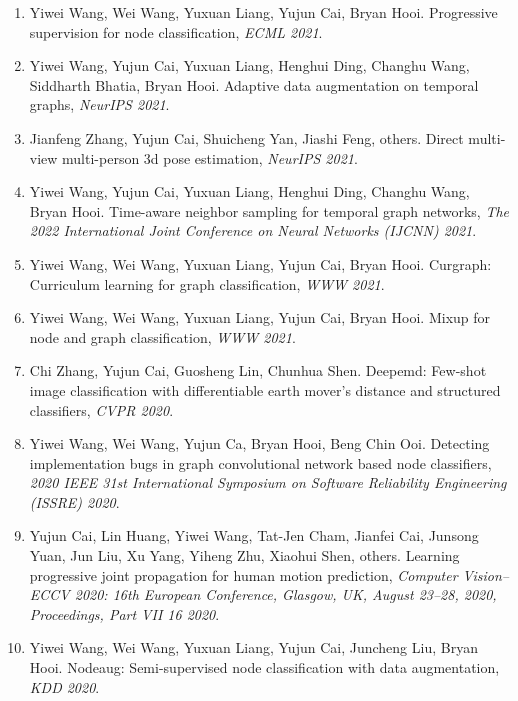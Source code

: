 \begin{enumerate}
\item Yiwei Wang, Wei Wang, Yuxuan Liang, Yujun Cai, Bryan Hooi. Progressive supervision for node classification, \textit{ECML 2021}.

\item Yiwei Wang, Yujun Cai, Yuxuan Liang, Henghui Ding, Changhu Wang, Siddharth Bhatia, Bryan Hooi. Adaptive data augmentation on temporal graphs, \textit{NeurIPS 2021}.

\item Jianfeng Zhang, Yujun Cai, Shuicheng Yan, Jiashi Feng, others. Direct multi-view multi-person 3d pose estimation, \textit{NeurIPS 2021}.

\item Yiwei Wang, Yujun Cai, Yuxuan Liang, Henghui Ding, Changhu Wang, Bryan Hooi. Time-aware neighbor sampling for temporal graph networks, \textit{The 2022 International Joint Conference on Neural Networks (IJCNN) 2021}.

\item Yiwei Wang, Wei Wang, Yuxuan Liang, Yujun Cai, Bryan Hooi. Curgraph: Curriculum learning for graph classification, \textit{WWW 2021}.

\item Yiwei Wang, Wei Wang, Yuxuan Liang, Yujun Cai, Bryan Hooi. Mixup for node and graph classification, \textit{WWW 2021}.

\item Chi Zhang, Yujun Cai, Guosheng Lin, Chunhua Shen. Deepemd: Few-shot image classification with differentiable earth mover's distance and structured classifiers, \textit{CVPR 2020}.

\item Yiwei Wang, Wei Wang, Yujun Ca, Bryan Hooi, Beng Chin Ooi. Detecting implementation bugs in graph convolutional network based node classifiers, \textit{2020 IEEE 31st International Symposium on Software Reliability Engineering (ISSRE) 2020}.

\item Yujun Cai, Lin Huang, Yiwei Wang, Tat-Jen Cham, Jianfei Cai, Junsong Yuan, Jun Liu, Xu Yang, Yiheng Zhu, Xiaohui Shen, others. Learning progressive joint propagation for human motion prediction, \textit{Computer Vision--ECCV 2020: 16th European Conference, Glasgow, UK, August 23--28, 2020, Proceedings, Part VII 16 2020}.

\item Yiwei Wang, Wei Wang, Yuxuan Liang, Yujun Cai, Juncheng Liu, Bryan Hooi. Nodeaug: Semi-supervised node classification with data augmentation, \textit{KDD 2020}.


\end{enumerate}
